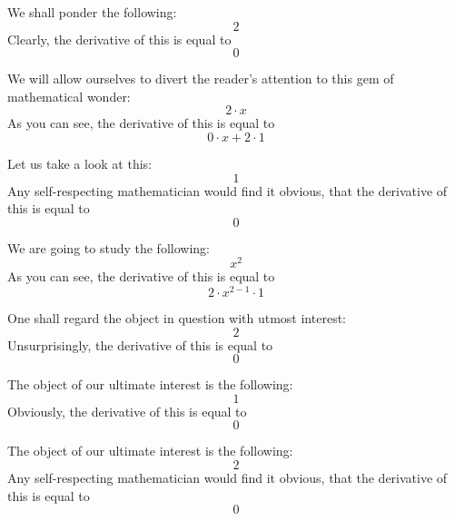 \documentclass{article}
\begin{document}
We shall ponder the following:
\begin{equation}
2 
\end{equation}
Clearly, the derivative of this is equal to
\begin{equation}
0 
\end{equation}

We will allow ourselves to divert the reader's attention to this gem of mathematical wonder:
\begin{equation}
2 \cdot x 
\end{equation}
As you can see, the derivative of this is equal to
\begin{equation}
0 \cdot x + 2 \cdot 1 
\end{equation}

Let us take a look at this:
\begin{equation}
1 
\end{equation}
Any self-respecting mathematician would find it obvious, that the derivative of this is equal to
\begin{equation}
0 
\end{equation}

We are going to study the following:
\begin{equation}
x ^{2 } 
\end{equation}
As you can see, the derivative of this is equal to
\begin{equation}
2 \cdot x ^{2 - 1 } \cdot 1 
\end{equation}

One shall regard the object in question with utmost interest:
\begin{equation}
2 
\end{equation}
Unsurprisingly, the derivative of this is equal to
\begin{equation}
0 
\end{equation}

The object of our ultimate interest is the following:
\begin{equation}
1 
\end{equation}
Obviously, the derivative of this is equal to
\begin{equation}
0 
\end{equation}

The object of our ultimate interest is the following:
\begin{equation}
2 
\end{equation}
Any self-respecting mathematician would find it obvious, that the derivative of this is equal to
\begin{equation}
0 
\end{equation}
\end{document}

